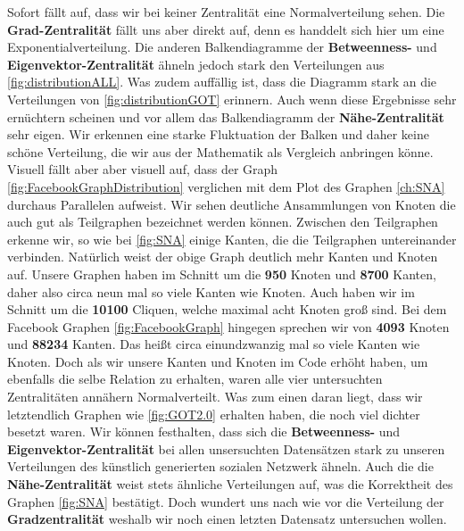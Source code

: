 Sofort fällt auf, dass wir bei keiner Zentralität eine Normalverteilung sehen. Die \textbf{Grad-Zentralität} fällt uns aber direkt auf, denn es handdelt sich hier um eine Exponentialverteilung. Die anderen Balkendiagramme der \textbf{Betweenness-} und \textbf{Eigenvektor-Zentralität} ähneln jedoch stark den Verteilungen aus \ref{fig:distributionALL}. Was zudem auffällig ist, dass die Diagramm stark an die Verteilungen von \ref{fig:distributionGOT} erinnern. Auch wenn diese Ergebnisse sehr ernüchtern scheinen und vor allem das Balkendiagramm der \textbf{Nähe-Zentralität} sehr eigen. Wir erkennen eine starke Fluktuation der Balken und daher keine schöne Verteilung, die wir aus der Mathematik als Vergleich anbringen könne. Visuell fällt aber  aber visuell auf, dass der Graph \ref{fig:FacebookGraphDistribution} verglichen mit dem Plot des Graphen \ref{ch:SNA} durchaus Parallelen aufweist. Wir sehen deutliche Ansammlungen von Knoten die auch gut als Teilgraphen bezeichnet werden können. Zwischen den Teilgraphen erkenne wir, so wie bei \ref{fig:SNA} einige Kanten, die die Teilgraphen untereinander verbinden. Natürlich weist der obige Graph deutlich mehr Kanten und Knoten auf. Unsere Graphen haben im Schnitt um die \textbf{950} Knoten und \textbf{8700} Kanten, daher also circa neun mal so viele Kanten wie Knoten. Auch haben wir im Schnitt um die \textbf{10100} Cliquen, welche maximal acht Knoten groß sind. Bei dem Facebook Graphen \ref{fig:FacebookGraph} hingegen sprechen wir von \textbf{4093} Knoten und \textbf{88234} Kanten. Das heißt circa einundzwanzig mal so viele Kanten wie Knoten. Doch als wir unsere Kanten und Knoten im Code erhöht haben, um ebenfalls die selbe Relation zu erhalten, waren alle vier untersuchten Zentralitäten annähern Normalverteilt. Was zum einen daran liegt, dass wir letztendlich Graphen wie \ref{fig:GOT2.0} erhalten haben, die noch viel dichter besetzt waren. Wir können festhalten, dass sich die \textbf{Betweenness-} und \textbf{Eigenvektor-Zentralität} bei allen unsersuchten Datensätzen stark zu unseren Verteilungen des künstlich generierten sozialen Netzwerk ähneln. Auch die die \textbf{Nähe-Zentralität} weist stets ähnliche Verteilungen auf, was die Korrektheit des Graphen \ref{fig:SNA} bestätigt. Doch wundert uns nach wie vor die Verteilung der \textbf{Gradzentralität} weshalb wir noch einen letzten Datensatz untersuchen wollen. 



